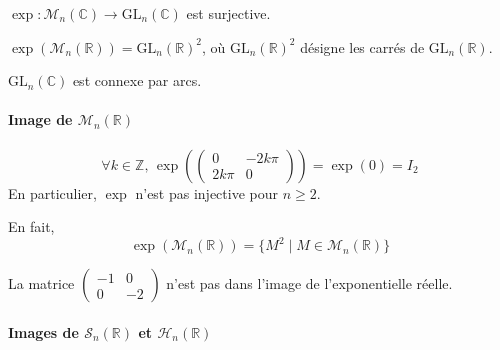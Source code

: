 	
	\begin{theorem}
		$\exp : \mathcal{M}_n(\mathbb{C}) \rightarrow \mathrm{GL}_n(\mathbb{C})$ est surjective.
	\end{theorem}
	
	\begin{application}
		$\exp(\mathcal{M}_n(\mathbb{R})) = \mathrm{GL}_n(\mathbb{R})^2$, où $\mathrm{GL}_n(\mathbb{R})^2$ désigne les carrés de $\mathrm{GL}_n(\mathbb{R})$.
	\end{application}
	
	
	\begin{application}
		$\mathrm{GL}_n(\mathbb{C})$ est connexe par arcs.
	\end{application}
	
	\paragraph{Image de \texorpdfstring{$\mathcal{M}_n(\mathbb{R})$}{Mₙ(R)}}
	
	
	\begin{example}
		\[ \forall k \in \mathbb{Z}, \, \exp \left( \begin{pmatrix} 0 & -2k\pi \\ 2k\pi & 0 \end{pmatrix} \right) = \exp(0) = I_2 \]
		En particulier, $\exp$ n'est pas injective pour $n \geq 2$.
	\end{example}
	
	\begin{proposition}
		En fait,
		\[ \exp(\mathcal{M}_n(\mathbb{R})) = \{ M^2 \mid M \in \mathcal{M}_n(\mathbb{R}) \} \]
	\end{proposition}
	
	\begin{example}
		La matrice $\begin{pmatrix} -1 & 0 \\ 0 & -2 \end{pmatrix}$ n'est pas dans l'image de l'exponentielle réelle.
	\end{example}
	
	\paragraph{Images de $\mathcal{S}_n(\mathbb{R})$ et $\mathcal{H}_n(\mathbb{R})$}
	
